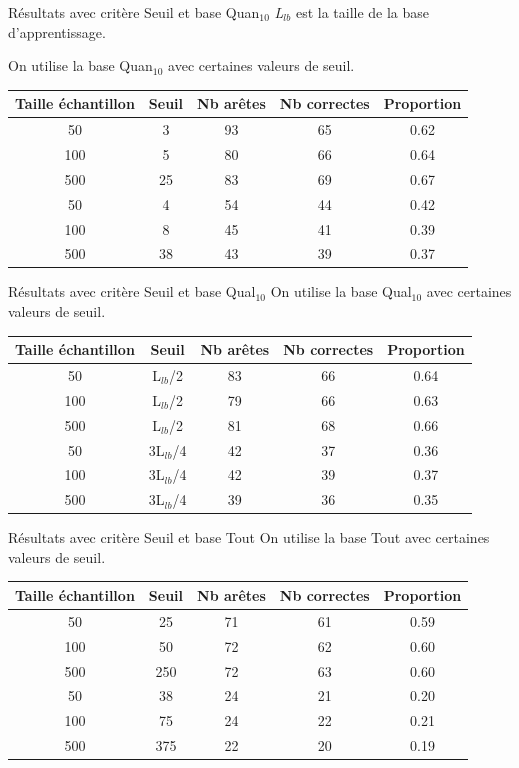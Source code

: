 \documentclass{beamer}
\begin{document}
\begin{frame}{Résultats avec critère Seuil et base Quan$_{10}$}
\emph{L$_{lb}$} est la taille de la base d'apprentissage. 


On utilise la base Quan$_{10}$ avec certaines valeurs de seuil.

\begin{tabular}{|c|c|c|c|c|}
   \hline
   Taille échantillon & Seuil & Nb arêtes & Nb correctes & Proportion\\
   \hline
   50 & 3 & 93 & 65 & 0.62  \\   
   \hline
   100 & 5 & 80 & 66 & 0.64  \\
   \hline
   500 & 25 & 83 & 69 & 0.67  \\
   \hline
   \hline
   50 & 4 & 54 & 44 & 0.42  \\
   \hline
   100 & 8 & 45 & 41 & 0.39  \\
   \hline
   500 & 38 & 43 & 39 & 0.37  \\
   \hline
\end{tabular}


\end{frame}

\begin{frame}{Résultats avec critère Seuil et base Qual$_{10}$}
On utilise la base Qual$_{10}$ avec certaines valeurs de seuil.
\begin{tabular}{|c|c|c|c|c|}
   \hline
   Taille échantillon & Seuil & Nb arêtes & Nb correctes & Proportion\\
    \hline
   50 & L$_{lb}$/2 & 83 & 66 & 0.64  \\
   \hline
   100 & L$_{lb}$/2 & 79 & 66 & 0.63  \\
   \hline
   500 & L$_{lb}$/2 & 81 & 68 & 0.66  \\
   \hline
   \hline
   50 & 3L$_{lb}$/4 & 42 & 37 & 0.36  \\
   \hline
   100 & 3L$_{lb}$/4 & 42 & 39 & 0.37  \\
   \hline
   500 & 3L$_{lb}$/4 & 39 & 36 & 0.35  \\
   \hline
\end{tabular}
\end{frame}

\begin{frame}{Résultats avec critère Seuil et base Tout}
On utilise la base Tout avec certaines valeurs de seuil.
\begin{tabular}{|c|c|c|c|c|}
   \hline
   Taille échantillon & Seuil & Nb arêtes & Nb correctes & Proportion\\
   \hline
   50 & 25 & 71 & 61 & 0.59  \\
   \hline
   100 & 50 & 72 & 62 & 0.60  \\
   \hline
   500 & 250 & 72 & 63 & 0.60  \\
   \hline
   \hline
   50 & 38 & 24 & 21 & 0.20  \\
   \hline
   100 & 75 & 24 & 22 & 0.21  \\
   \hline
   500 & 375 & 22 & 20 & 0.19  \\
   \hline
\end{tabular}
\end{frame}
\end{document}
